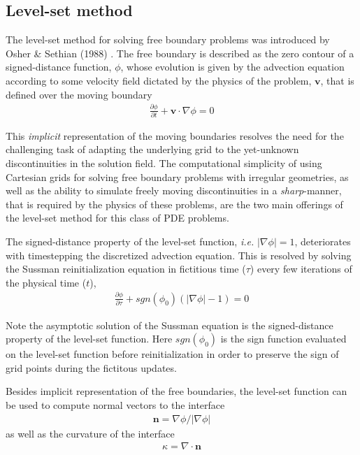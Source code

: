 \documentclass{elsarticle}
\begin{document}
\subsection{Level-set method}
The level-set method for solving free boundary problems was introduced by Osher \& Sethian (1988) \cite{osher1988fronts}. The free boundary is described as the zero contour of a signed-distance function, $\phi$, whose evolution is given by the advection equation according to some velocity field dictated by the physics of the problem, $\mathbf{v}$, that is defined over the moving boundary
\begin{align}
	\frac{\partial \phi}{\partial t} + \mathbf{v}\cdot \nabla \phi = 0
\end{align}

This \textit{implicit} representation of the moving boundaries resolves the need for the challenging task of adapting the underlying grid to the yet-unknown discontinuities in the solution field. The computational simplicity of using Cartesian grids for solving free boundary problems with irregular geometries, as well as the ability to simulate freely moving discontinuities in a \textit{sharp}-manner, that is required by the physics of these problems, are the two main offerings of the level-set method for this class of PDE problems.

The signed-distance property of the level-set function, \textit{i.e.} $\vert \nabla \phi\vert =1 $, deteriorates with timestepping the discretized advection equation. This is resolved by solving the Sussman reinitialization equation \cite{SUSSMAN1994146} in fictitious time ($\tau$) every few iterations of the physical time ($t$),
\begin{align}
	\frac{\partial \phi}{\partial \tau} + sgn(\phi_0) (\vert \nabla \phi \vert - 1) = 0 \label{eq::sussman}
\end{align}

Note the asymptotic solution of the Sussman equation is the signed-distance property of the level-set function. Here $sgn(\phi_0)$ is the sign function evaluated on the level-set function before reinitialization in order to preserve the sign of grid points during the fictitous updates.

Besides implicit representation of the free boundaries, the level-set function can be used to compute normal vectors to the interface 
\begin{align*}
	\mathbf{n} = \nabla\phi / \vert \nabla \phi \vert 
\end{align*}
as well as the curvature of the interface
\begin{align*}
	\kappa = \nabla \cdot \mathbf{n}
\end{align*}
\end{document}
